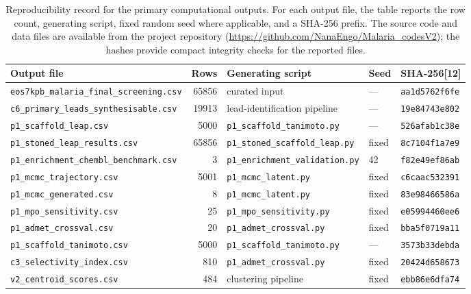 \documentclass[journal=jcisd8,manuscript=suppinfo]{achemso}
\begin{document}
\begin{table}[!htbp]
\centering
\caption{Reproducibility record for the primary computational outputs. For each output file, the table reports the row count, generating script, fixed random seed where applicable, and a SHA-256 prefix. The source code and data files are available from the project repository (\url{https://github.com/NanaEngo/Malaria_codesV2}); the hashes provide compact integrity checks for the reported files.}
\label{tab:reproducibility}
\begin{tabular}{@{}l r l l l@{}}
\toprule
\textbf{Output file} & \textbf{Rows} & \textbf{Generating script} & \textbf{Seed} & \textbf{SHA-256[12]} \\
\midrule
\texttt{eos7kpb\_malaria\_final\_screening.csv} & \num{65856} & curated input & --- & \texttt{aa1d5762f6fe} \\
\texttt{c6\_primary\_leads\_synthesisable.csv} & \num{19913} & lead-identification pipeline & --- & \texttt{19e84743e802} \\
\texttt{p1\_scaffold\_leap.csv} & \num{5000} & \texttt{p1\_scaffold\_tanimoto.py} & --- & \texttt{526afab1c38e} \\
\texttt{p1\_stoned\_leap\_results.csv} & \num{65856} & \texttt{p1\_stoned\_scaffold\_leap.py} & fixed & \texttt{8c7104f1a7e9} \\
\texttt{p1\_enrichment\_chembl\_benchmark.csv} & \num{3} & \texttt{p1\_enrichment\_validation.py} & \num{42} & \texttt{f82e49ef86ab} \\
\texttt{p1\_mcmc\_trajectory.csv} & \num{5001} & \texttt{p1\_mcmc\_latent.py} & fixed & \texttt{c6caac532391} \\
\texttt{p1\_mcmc\_generated.csv} & \num{8} & \texttt{p1\_mcmc\_latent.py} & fixed & \texttt{83e98466586a} \\
\texttt{p1\_mpo\_sensitivity.csv} & \num{25} & \texttt{p1\_mpo\_sensitivity.py} & fixed & \texttt{e05994460ee6} \\
\texttt{p1\_admet\_crossval.csv} & \num{20} & \texttt{p1\_admet\_crossval.py} & fixed & \texttt{bba5f0719a11} \\
\texttt{p1\_scaffold\_tanimoto.csv} & \num{5000} & \texttt{p1\_scaffold\_tanimoto.py} & --- & \texttt{3573b33debda} \\
\texttt{c3\_selectivity\_index.csv} & \num{810} & \texttt{p1\_admet\_crossval.py} & fixed & \texttt{20424d658673} \\
\texttt{v2\_centroid\_scores.csv} & \num{484} & clustering pipeline & fixed & \texttt{ebb86e6dfa74} \\
\bottomrule
\end{tabular}
\end{table}

\nocite{Bickerton2012, Derringer1980, Harrington1965, Lipinski1997, Lipinski2001, Temgoua2026}


\end{document}
